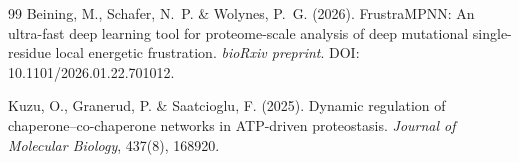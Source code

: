 \documentclass[12pt,a4paper]{article}
\theoremstyle{remark}
\begin{document}
\begin{thebibliography}{99}
Beining, M., Schafer, N.~P. \& Wolynes, P.~G. (2026).
\newblock FrustraMPNN: An ultra-fast deep learning tool for proteome-scale analysis of deep mutational single-residue local energetic frustration.
\newblock \textit{bioRxiv preprint}.
\newblock DOI: 10.1101/2026.01.22.701012.

Kuzu, O., Granerud, P. \& Saatcioglu, F. (2025).
\newblock Dynamic regulation of chaperone--co-chaperone networks in ATP-driven proteostasis.
\newblock \textit{Journal of Molecular Biology}, 437(8), 168920.

\end{thebibliography}
\end{document}
